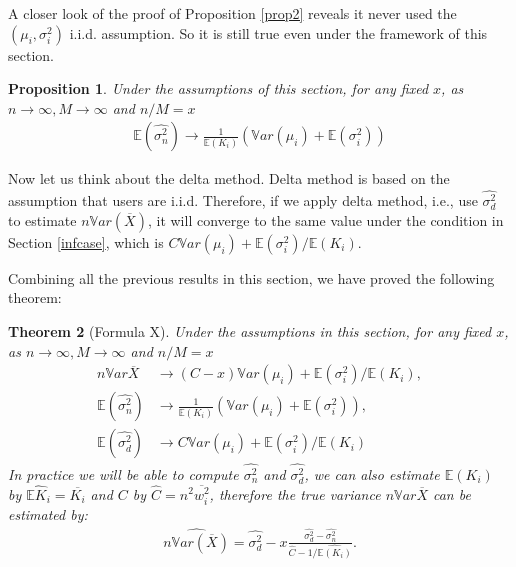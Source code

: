 \documentclass[12pt,letterpaper]{article}
\newcommand{\wht}{\widehat}
\newcommand{\var}{\ensuremath{\mathbb Var}}
\newcommand{\bbe}{\mathbb{E}}
\newcommand{\xbar}{\overline{X}}
\newcommand{\naiveest}{\wht{\sigma^2_n}}
\newcommand{\deltaest}{\wht{\sigma^2_d}}
\newtheorem{thm}{Theorem}
\newtheorem{prop}[thm]{Proposition}
\begin{document}
A closer look of the proof of Proposition \ref{prop2} reveals it never used the $(\mu_i,\sigma_i^2)$ i.i.d. assumption. So it is still true even under the framework of this section. 
\begin{prop}\label{prop4}
Under the assumptions of this section, for any fixed $x$, as $n\to \infty, M\to \infty$ and $n/M = x$
\begin{align}
\bbe(\naiveest) \to  \frac{1}{\bbe(K_i)} (\var(\mu_i)+\bbe(\sigma_i^2))
\end{align}
\end{prop}

Now let us think about the delta method. Delta method is based on the assumption that users are i.i.d. Therefore, if we apply delta method, i.e., use $\deltaest$ to estimate $n\var(\xbar)$, it will converge to the same value under the condition in Section \ref{infcase}, which is $C\var(\mu_i) + \bbe(\sigma^2_i)/\bbe (K_i)$. 

Combining all the previous results in this section, we have proved the following theorem:
\begin{thm}[Formula X]\label{thm-2}
Under the assumptions in this section, for any fixed $x$, as $n\to \infty, M\to \infty$ and $n/M = x$
\begin{align}
 n\var\xbar &\to (C-x) \var(\mu_i) + \bbe(\sigma^2_i)/\bbe (K_i), \\
\bbe(\naiveest)&\to   \frac{1}{\bbe(K_i)} (\var(\mu_i)+\bbe(\sigma_i^2)),\\
\bbe(\deltaest)&\to C\var(\mu_i) + \bbe(\sigma^2_i)/\bbe (K_i)
\end{align}
In practice we will be able to compute $\naiveest$ and $\deltaest$, we can also estimate $\bbe(K_i)$ by $\wht{\bbe{K_i}}=\overline{K_i}$ and $C$ by $\wht{C}=n^2\overline{w_i^2}$, therefore the true variance $n\var\xbar$ can be estimated by:
\begin{align}\label{formula}
\wht{n\var(\xbar)} = \deltaest - x \frac{\deltaest-\naiveest}{\wht{C}-1/\wht{\bbe(K_i)}}.\tag{Formula X}
\end{align}
\end{thm}
\end{document}
